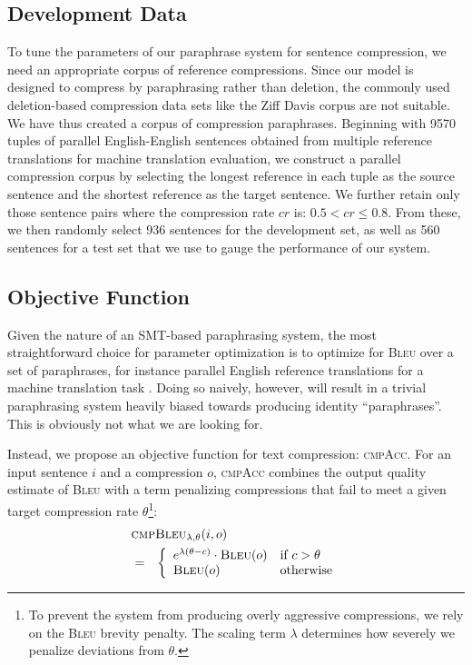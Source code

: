 \documentclass[11pt]{article}
\begin{document}
\subsection{Development Data}
\label{dev-data}
To tune the parameters of our paraphrase system for sentence
compression, we need an appropriate corpus of reference
compressions. Since our model is designed to compress by paraphrasing
rather than deletion, the commonly used deletion-based compression
data sets like the Ziff Davis corpus are not suitable. We have
thus created a corpus of compression paraphrases. Beginning with 9570
tuples of parallel English-English sentences obtained from multiple
reference translations for machine translation evaluation, we
construct a parallel compression corpus by selecting the longest
reference in each tuple as the source sentence and the shortest
reference as the target sentence. We further retain only those
sentence pairs where the compression rate $\mathit{cr}$ is: $0.5 <
\mathit{cr} \leq 0.8$. From these, we then randomly select 936
sentences for the development set, as well as 560 sentences for a test
set that we use to gauge the performance of our system.


\subsection{Objective Function}
\label{objective-fn}

Given the nature of an SMT-based paraphrasing system, the most
straightforward choice for parameter optimization is to optimize for
\textsc{Bleu} over a set of paraphrases, for instance parallel English
reference translations for a machine translation task
\cite{Madnani2007}. Doing so naively, however, will result in a
trivial paraphrasing system heavily biased towards producing identity
``paraphrases''. This is obviously not what we are looking for.


Instead, we propose an objective function for text compression:
\textsc{cmpAcc}. For an input sentence $i$ and a compression $o$,
\textsc{cmpAcc} combines the output quality estimate of \textsc{Bleu}
with a term penalizing compressions that fail to meet a given target
compression rate $\theta$\footnote{To prevent the system from
  producing overly aggressive compressions, we rely on the
  \textsc{Bleu} brevity penalty. The scaling term $\lambda$ determines
  how severely we penalize deviations from $\theta$.}:
\begin{eqnarray}
  \lefteqn{ \textsc{cmpBleu}_{\lambda,\theta} (i, o) } \nonumber \\
  &=& \left\{ \begin{array}{ll}
      e^{\lambda (\theta - c)} \cdot \textsc{Bleu}(o) & \textrm{if
        $c > \theta$} \nonumber \\ 
      \textsc{Bleu}(o) & \textrm{otherwise}
\end{array} \right.
\end{eqnarray}
\end{document}
